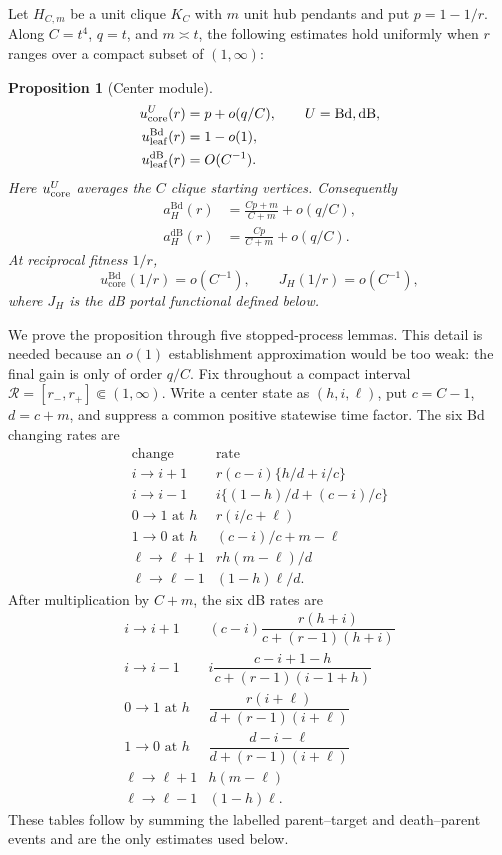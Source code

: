 \documentclass[11pt]{article}
\newtheorem{proposition}[theorem]{Proposition}
\theoremstyle{definition}
\theoremstyle{remark}
\newcommand{\Bd}{\mathrm{Bd}}
\newcommand{\dB}{\mathrm{dB}}
\begin{document}
Let $H_{C,m}$ be a unit clique $K_C$ with $m$ unit hub pendants and put
$p=1-1/r$.  Along $C=t^4$, $q=t$, and $m\asymp t$, the following estimates hold
uniformly when $r$ ranges over a compact subset of $(1,\infty)$:
\begin{proposition}[Center module]
\label{prop:center}
\begin{align}
 u_{\rm core}^U(r)&=p+o(q/C),\qquad U=\Bd,\dB,\label{eq:core}\\
 u_{\rm leaf}^{\Bd}(r)&=1-o(1),\label{eq:leaf-Bd}\\
 u_{\rm leaf}^{\dB}(r)&=O(C^{-1}).\label{eq:leaf-dB}
\end{align}
Here $u_{\rm core}^U$ averages the $C$ clique starting vertices.
Consequently
\begin{align}
 a_H^{\Bd}(r)&=\frac{Cp+m}{C+m}+o(q/C),\label{eq:center-Bd}\\
 a_H^{\dB}(r)&=\frac{Cp}{C+m}+o(q/C).\label{eq:center-dB}
\end{align}
At reciprocal fitness $1/r$,
\[
 u_{\mathrm{core}}^{\Bd}(1/r)=o(C^{-1}),\qquad J_H(1/r)=o(C^{-1}),
\]
where $J_H$ is the dB portal functional defined below.
\end{proposition}

We prove the proposition through five stopped-process lemmas.  This detail is
needed because an $o(1)$ establishment approximation would be too weak: the
final gain is only of order $q/C$.  Fix throughout a compact interval
$\mathcal R=[r_-,r_+]\Subset(1,\infty)$.  Write a center state as
$(h,i,\ell)$, put $c=C-1$, $d=c+m$, and suppress a common positive statewise
time factor.  The six Bd changing rates are
\[
\begin{array}{c|c}
\text{change}&\text{rate}\\ \hline
i\to i+1&r(c-i)\{h/d+i/c\}\\
i\to i-1&i\{(1-h)/d+(c-i)/c\}\\
0\to1\text{ at }h&r(i/c+\ell)\\
1\to0\text{ at }h&(c-i)/c+m-\ell\\
\ell\to\ell+1&rh(m-\ell)/d\\
\ell\to\ell-1&(1-h)\ell/d .
\end{array}
\]
After multiplication by $C+m$, the six dB rates are
\[
\begin{array}{c|c}
i\to i+1&(c-i)\dfrac{r(h+i)}{c+(r-1)(h+i)}\\[1mm]
i\to i-1&i\dfrac{c-i+1-h}{c+(r-1)(i-1+h)}\\[1mm]
0\to1\text{ at }h&\dfrac{r(i+\ell)}{d+(r-1)(i+\ell)}\\[1mm]
1\to0\text{ at }h&\dfrac{d-i-\ell}{d+(r-1)(i+\ell)}\\[1mm]
\ell\to\ell+1&h(m-\ell)\\
\ell\to\ell-1&(1-h)\ell .
\end{array}
\]
These tables follow by summing the labelled parent--target and
death--parent events and are the only estimates used below.
\end{document}
